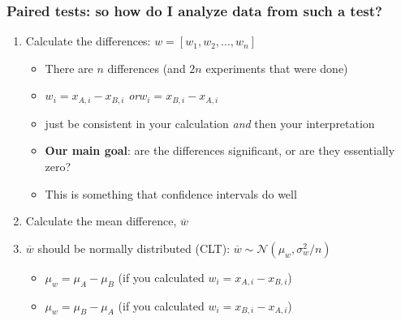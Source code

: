 \begin{frame}\frametitle{Paired tests: so how do I analyze data from such a test?}

	
	\begin{enumerate}
	
		\item	Calculate the differences: $w = [w_1, w_2, \ldots, w_n]$
		\begin{itemize}
	 		\item	There are $n$ differences (and $2n$ experiments that were done)
			\item	$w_i = x_{A,i} - x_{B,i}$  \qquad\emph{or}\qquad $w_i = x_{B,i} - x_{A,i}$
			\item	just be consistent in your calculation \emph{and} then your interpretation
	 		\item	\textbf{Our main goal}: are the differences significant, or are they essentially zero?
	 		\item	This is something that confidence intervals do well
	 	\end{itemize}
	\pause

		\vspace{12pt}
	 	\item	Calculate the mean difference, $\overline{w}$
		
	\pause
		\vspace{12pt}
	 	\item	$\overline{w}$ should be normally distributed (CLT): $\overline{w} \sim \mathcal{N}\left(\mu_w, \sigma_w^2/n \right)$
				\begin{itemize}
		 			\item	$\mu_w = \mu_A - \mu_B$  (if you calculated $w_i = x_{A,i} - x_{B,i}$)
		 			\item	$\mu_w = \mu_B - \mu_A$  (if you calculated $w_i = x_{B,i} - x_{A,i}$)
		 		\end{itemize}

	\end{enumerate}

\end{frame}


